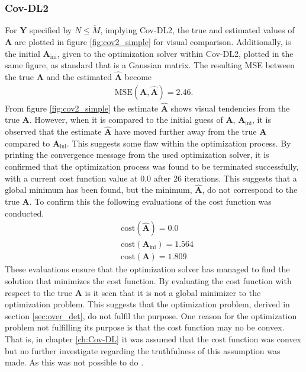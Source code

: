\subsubsection{Cov-DL2}
For $\mathbf{Y}$ specified by $N \leq \widetilde{M}$, implying Cov-DL2, the true and estimated values of $\mathbf{A}$ are plotted in figure \ref{fig:cov2_simple} for visual comparison. 
Additionally, is the initial $\mathbf{A}_{\text{ini}}$, given to the optimization solver within Cov-DL2, plotted in the same figure, as standard that is a Gaussian matrix. 
The resulting MSE between the true $\mathbf{A}$ and the estimated $\hat{\mathbf{A}}$ become 
\begin{align*}
\text{MSE}(\mathbf{A}, \hat{\mathbf{A}}) = 2.46.
\end{align*}
From figure \ref{fig:cov2_simple} the estimate $\hat{\mathbf{A}}$ shows visual tendencies from the true $\mathbf{A}$. 
However, when it is compared to the initial guess of $\textbf{A}$, $\mathbf{A}_{\text{ini}}$, it is observed that the estimate $\hat{\mathbf{A}}$ have moved further away from the true $\mathbf{A}$ compared to $\mathbf{A}_{\text{ini}}$. 
This suggests some flaw within the optimization process. 
By printing the convergence message from the used optimization solver, it is confirmed that the optimization process was found to be terminated successfully, with a current cost function value at $0.0$ after 26 iterations. 
This suggests that a global minimum has been found, but the minimum, $\hat{\mathbf{A}}$, do not correspond to the true $\mathbf{A}$. 
To confirm this the following evaluations of the cost function was conducted. 
\begin{align*}
&\text{cost}(\hat{\mathbf{A}}) = 0.0\\
&\text{cost}(\mathbf{A}_{\text{ini}}) = 1.564\\
&\text{cost}(\mathbf{A}) = 1.809
\end{align*}
These evaluations ensure that the optimization solver has managed to find the solution that minimizes the cost function. 
By evaluating the cost function with respect to the true $\mathbf{A}$ is it seen that it is not a global minimizer to the optimization problem. 
This suggests that the optimization problem, derived in section \ref{sec:over_det}, do not fulfil the purpose.
One reason for the optimization problem not fulfilling its purpose is that the cost function may no be convex. 
That is, in chapter \ref{ch:Cov-DL} it was assumed that the cost function was convex but no further investigate regarding the truthfulness of this assumption was made. As this was not possible to do .
